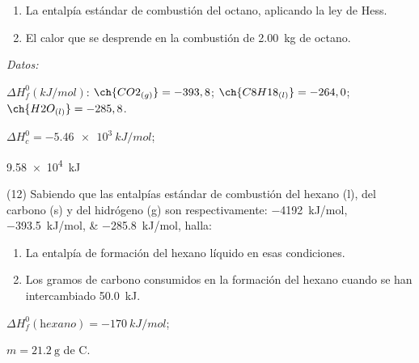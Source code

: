 \documentclass[10pt]{article}
\newenvironment{gexdatos}{
      \vspace{2pt}\noindent\textit{Datos: }
    }{\vspace{5pt}}
\begin{document}
\begin{multicols}{2}
\begin{exercise}[
    tags    = {},
    topics  = {química, termodinámica, termoquímica},
    source  = {FQ 1B MGH 2016, p180, e11},
  ]
  \begin{enumerate}
    \item La entalpía estándar de combustión del octano, aplicando la ley de Hess.
    \item El calor que se desprende en la combustión de \SI{2.00}{\kilo\gram} de octano.
  \end{enumerate}

  \begin{gexdatos}
    \( \Delta H^0_f (\si{kJ/mol}) \):
    \( \ch{CO2_{(g)}}   = -393,8 \);
    \( \ch{C8H18_{(l)}} = -264,0 \);
    \( \ch{H2O_{(l)}}   = -285,8 \).
  \end{gexdatos}
\end{exercise}

\begin{solution}
  \begin{enumerate*}
    \item \( \Delta H^0_c = \SI{-5.46e3}{kJ/mol} \); \item \SI{9.58e4}{kJ}
  \end{enumerate*}
\end{solution}




\begin{exercise}[
    tags    = {},
    topics  = {química, termodinámica, termoquímica},
    source  = {FQ 1B MGH 2016, p180, e12},
  ]
  (12) Sabiendo que las entalpías estándar de combustión del
  hexano (l), del carbono (s) y del hidrógeno (g) son respectivamente:
  \SIlist{-4192;-393,5;-285,8}{kJ/mol}, halla:

  \begin{enumerate}
    \item La entalpía de formación del hexano líquido en esas condiciones.
    \item Los gramos de carbono consumidos en la formación del hexano cuando se han intercambiado \SI{50.0}{kJ}.
  \end{enumerate}
\end{exercise}

\begin{solution}
  \begin{enumerate*}
    \item \( \Delta H^0_f (\textit{hexano}) = \SI{-170}{kJ/mol} \);
    \item \( m = \SI{21.2}{\gram} \) de C.
  \end{enumerate*}
\end{solution}





\end{multicols}
\end{document}
